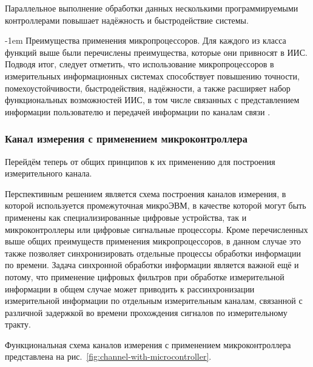 \documentclass[a4paper, 14pt, titlepage]{extarticle}
\makeatletter
\renewcommand{\paragraph}{%
    \@startsection{paragraph}{4}%
    {\parindent}{\z@}{-1em}%
    {\normalfont\normalsize\bfseries}%
  }
\makeatother
\begin{document}
  Параллельное выполнение обработки данных несколькими программируемыми
  контроллерами повышает надёжность и быстродействие системы.

  \paragraph{Преимущества применения микропроцессоров.}
  Для каждого из класса функций выше были перечислены преимущества, которые они привносят в ИИС.
  Подводя итог, следует отметить, что использование микропроцессоров в измерительных информационных системах способствует
  повышению точности, помехоустойчивости, быстродействия, надёжности, а также расширяет набор
  функциональных возможностей ИИС, в том числе связанных с представлением информации пользователю
  и передачей информации по каналам связи \cite{klaassen-methods}.

  \subsubsection{Канал измерения с применением микроконтроллера}

  Перейдём теперь от общих принципов к их применению для построения измерительного канала.

  Перспективным решением является схема построения каналов измерения, в которой
  используется промежуточная микроЭВМ, в качестве которой могут быть применены как
  специализированные цифровые устройства, так и микроконтроллеры или цифровые сигнальные процессоры.
  Кроме перечисленных выше общих преимуществ применения микропроцессоров, в данном случае это также
  позволяет синхронизировать отдельные процессы обработки информации по времени. Задача синхронной обработки информации
  является важной ещё и потому, что применение цифровых фильтров при обработке измерительной
  информации в общем случае может приводить к рассинхронизации измерительной информации по отдельным
  измерительным каналам, связанной с различной задержкой во времени прохождения сигналов по
  измерительному тракту.

  Функциональная схема каналов измерения с применением микроконтроллера  представлена на
  рис.~\ref{fig:channel-with-microcontroller}.
\end{document}
